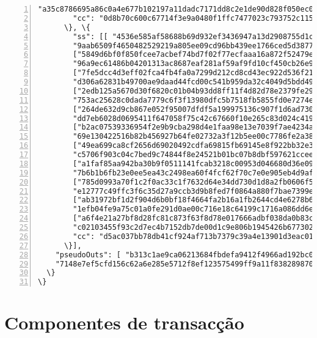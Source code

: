 \begin{Verbatim}[commandchars=\\\{\}, numbers=left]
        "a35c8786695a86c0a4e677b102197a11dadc7171dd8c2e1de90d828f050ec00f"]], 
        "cc": "0d8b70c600c67714f3e9a0480f1ffc7477023c793752c1152d5df0813f75ff0f"
      \}, \{
        "ss": [[ "4536e585af58688b69d932ef3436947a13d2908755d1c644ca9d6a978f0f0206",
        "9aab6509f4650482529219a805ee09cd96bb439ee1766ced5d3877bf1518370b"],
        ["5849d6bf0f850fcee7acbef74bd7f02f77ecfaaa16a872f52479ebd27339760f",
        "96a9ec61486b04201313ac8687eaf281af59af9fd10cf450cb26e9dc8f1ce804"],
        ["7fe5dcc4d3eff02fca4fb4fa0a7299d212cd8cd43ec922d536f21f92c8f93f00",
        "d306a62831b49700ae9daad44fcd00c541b959da32c4049d5bdd49be28d96701"],
        ["2edb125a5670d30f6820c01b04b93dd8ff11f4d82d78e2379fe29d7a68d9c103",
        "753ac25628c0dada7779c6f3f13980dfc5b7518fb5855fd0e7274e3075a3410c"],
        ["264de632d9cb867e052f95007dfdf5a199975136c907f1d6ad73061938f49c01",
        "dd7eb6028d0695411f647058f75c42c67660f10e265c83d024c4199bed073d01"],
        ["b2ac07539336954f2e9b9cba298d4e1faa98e13e7039f7ae4234ac801641340f",
        "69e130422516b82b456927b64fe02732a3f12b5ee00c7786fe2a381325bf3004"],
        ["49ea699ca8cf2656d69020492cdfa69815fb69145e8f922bb32e358c23cebb0f",
        "c5706f903c04c7bed9c74844f8e24521b01bc07b8dbf597621cceeeb3afc1d0c"],
        ["a1faf85aa942ba30b9f0511141fcab3218c00953d046680d36e09c35c04be905",
        "7b6b1b6fb23e0ee5ea43c2498ea60f4fcf62f70c7e0e905eb4d9afa1d0a18800"],
        ["785d0993a70f1c2f0ac33c1f7632d64e34dd730d1d8a2fb0606f5770ed633506",
        "e12777c49ffc3f6c35d27a9ccb3d9b8fed7f0864a880f7bae7399e334207280e"],
        ["ab31972bf1d2f904d6b0bf18f4664fa2b16a1fb2644cd4e6278b63ade87b6d09",
        "1efb04fe9a75c01a0fe291d0ae00c716e18c64199c1716a086dd6e32f63e0a07"],
        ["a6f4e21a27bf8d28fc81c873f63f8d78e017666adbf038da0b83c2ad04ef6805",
        "c02103455f93c2d7ec4b7152db7de00d1c9e806b1945426b6773026b4a85dd03"]], 
        "cc": "d5ac037bb78db41cf924af713b7379c39a4e13901d3eac017238550a1a3b910a"
      \}],
    "pseudoOuts": [ "b313c1ae9ca06213684fbdefa9412f4966ad192bc0b2f74ed1731381adb7ab58",
    "7148e7ef5cfd156c62a6e285e5712f8ef123575499ff9a11f838289870522423"]
  \}
\}
\end{Verbatim}



\section*{Componentes de transacção}
	
